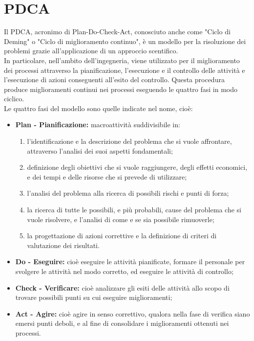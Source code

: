 
\section{PDCA}
Il PDCA, acronimo di Plan-Do-Check-Act, conosciuto anche come "Ciclo di Deming" o "Ciclo di miglioramento continuo", è un modello per la risoluzione dei problemi grazie all'applicazione di un approccio scentifico.\\
In particolare, nell'ambito dell'ingegneria, viene utilizzato per il miglioramento dei processi attraverso la pianificazione, l'esecuzione e il controllo delle attività e l'esecuzione di azioni conseguenti all'esito del controllo. Questa procedura produce miglioramenti continui nei processi eseguendo le quattro fasi in modo ciclico.\\
Le quattro fasi del modello sono quelle indicate nel nome, cioè:
\begin{itemize}
\item \textbf{Plan - Pianificazione:} macroattività suddivisibile in:
	\begin{enumerate}
	\item l'identificazione e la descrizione del problema che si vuole affrontare, attraverso l'analisi dei suoi aspetti fondamentali;
	\item definizione degli obiettivi che si vuole raggiungere, degli effetti economici, e dei tempi e delle risorse che si prevede di utilizzare;
	\item l'analisi del problema alla ricerca di possibili rischi e punti di forza;
	\item la ricerca di tutte le possibili, e più probabili, cause del problema che si vuole risolvere, e l'analisi di come e se sia possibile rimuoverle;
	\item la progettazione di azioni correttive e la definizione di criteri di valutazione dei risultati.
	\end{enumerate}
\item \textbf{Do - Eseguire:} cioè eseguire le attività pianificate, formare il personale per svolgere le attività nel modo corretto, ed eseguire le attività di controllo;
\item \textbf{Check - Verificare:} cioè analizzare gli esiti delle attività allo scopo di trovare possibili punti su cui eseguire miglioramenti;
\item \textbf{Act - Agire:} cioè agire in senso correttivo, qualora nella fase di verifica siano emersi punti deboli, e al fine di consolidare i miglioramenti ottenuti nei processi.
\end{itemize}
